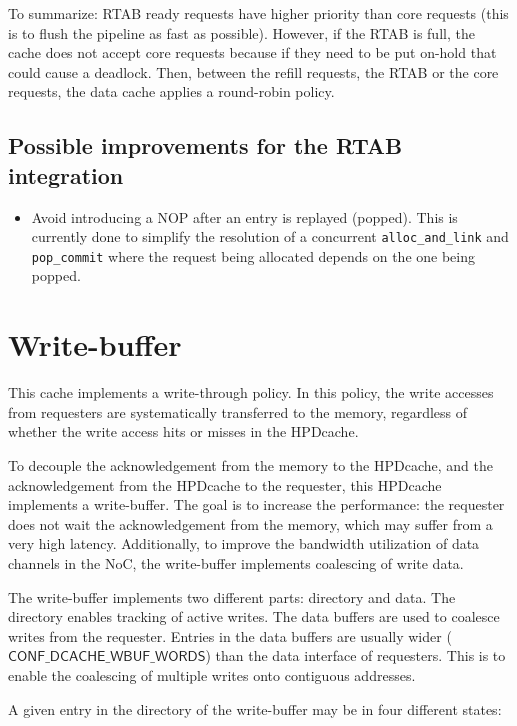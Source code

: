 \documentclass[10pt,titlepage,twoside]{book}
\begin{document}
To summarize: \ac{RTAB} ready requests have higher priority than core requests (this is to flush the pipeline as fast as possible).
However, if the \ac{RTAB} is full, the cache does not accept core requests because if they need to be put on-hold that could cause a deadlock.
Then, between the refill requests, the \ac{RTAB} or the core requests, the data cache applies a round-robin policy.

\subsection{Possible improvements for the \acs*{RTAB} integration}

\begin{itemize}
  \item Avoid introducing a NOP after an entry is replayed (popped).
  This is currently done to simplify the resolution of a concurrent \verb$alloc_and_link$ and \verb$pop_commit$ where the request being allocated depends on the one being popped.
\end{itemize}


\section{Write-buffer}

This cache implements a write-through policy.
In this policy, the write accesses from requesters are systematically transferred to the memory, regardless of whether the write access hits or misses in the \ac{HPDcache}.

To decouple the acknowledgement from the memory to the \ac{HPDcache}, and the acknowledgement from the \ac{HPDcache} to the requester, this \ac{HPDcache} implements a write-buffer.
The goal is to increase the performance: the requester does not wait the acknowledgement from the memory, which may suffer from a very high latency.
Additionally, to improve the bandwidth utilization of data channels in the \ac{NoC}, the write-buffer implements coalescing of write data.

The write-buffer implements two different parts: directory and data.
The directory enables tracking of active writes.
The data buffers are used to coalesce writes from the requester.
Entries in the data buffers are usually wider ($\mathsf{CONF\_DCACHE\_WBUF\_WORDS}$) than the data interface of requesters.
This is to enable the coalescing of multiple writes onto contiguous addresses.

A given entry in the directory of the write-buffer may be in four different states:
\end{document}

